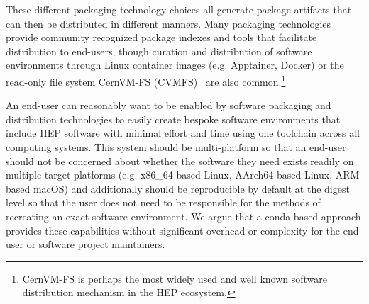 These different packaging technology choices all generate package artifacts that can then be distributed in different manners.
Many packaging technologies provide community recognized package indexes and tools that facilitate distribution to end-users, though curation and distribution of software environments through Linux container images (e.g. Apptainer, Docker) or the read-only file system CernVM-FS (CVMFS)~\cite{Blomer:2011zz} are also common.\footnote{CernVM-FS is perhaps the most widely used and well known software distribution mechanism in the HEP ecosystem.}

An end-user can reasonably want to be enabled by software packaging and distribution technologies to easily create bespoke software environments that include HEP software with minimal effort and time using one toolchain across all computing systems.
This system should be multi-platform so that an end-user should not be concerned about whether the software they need exists readily on multiple target platforms (e.g. x86\_64-based Linux, AArch64-based Linux, ARM-based macOS) and additionally should be reproducible by default at the digest level so that the user does not need to be responsible for the methods of recreating an exact software environment.
We argue that a conda-based approach provides these capabilities without significant overhead or complexity for the end-user or software project maintainers.
